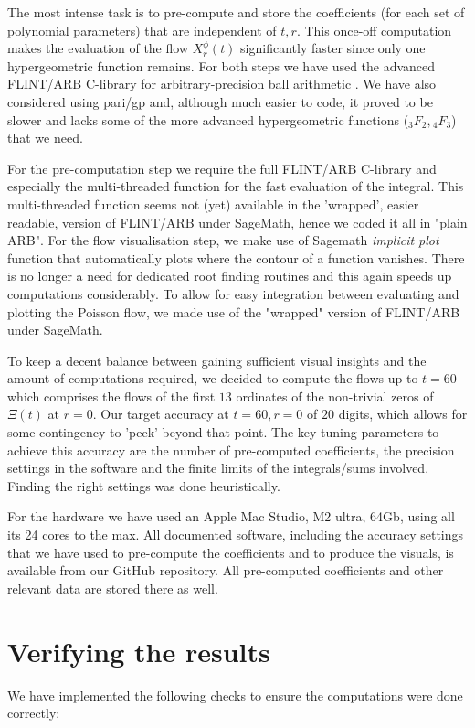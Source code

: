 \documentclass[a4paper,11pt,twoside]{amsart}
\begin{document}
The most intense task is to pre-compute and store the coefficients (for each set of polynomial parameters) that are independent of $t, r$. This once-off computation makes the evaluation of the flow $X^\phi_r(t)$ significantly faster since only one hypergeometric function remains. For both steps we have used the advanced FLINT/ARB C-library for arbitrary-precision ball arithmetic \cite{arb}. We have also considered using pari/gp and, although much easier to code, it proved to be slower and lacks some of the more advanced hypergeometric functions (${}_3F_2,{}_4F_3$) that we need.

For the pre-computation step we require the full FLINT/ARB C-library and especially the multi-threaded function for the fast evaluation of the integral. This multi-threaded function seems not (yet) available in the 'wrapped', easier readable, version of FLINT/ARB under SageMath, hence we coded it all in "plain ARB". For the flow visualisation step, we make use of Sagemath \textit{implicit plot} function that automatically plots where the contour of a function vanishes. There is no longer a need for dedicated root finding routines and this again speeds up computations considerably. To allow for easy integration between evaluating and plotting the Poisson flow, we made use of the "wrapped" version of FLINT/ARB under SageMath.    

To keep a decent balance between gaining sufficient visual insights and the amount of computations required, we decided to compute the flows up to $t=60$ which comprises the flows of the first $13$ ordinates of the non-trivial zeros of $\Xi(t)$ at $r=0$. Our target accuracy at $t=60, r=0$ of $20$ digits, which allows for some contingency to 'peek' beyond that point. The key tuning parameters to achieve this accuracy are the number of pre-computed coefficients, the precision settings in the software and the finite limits of the integrals/sums involved. Finding the right settings was done heuristically. 

For the hardware we have used an Apple Mac Studio, M2 ultra, 64Gb, using all its 24 cores to the max. All documented software, including the accuracy settings that we have used to pre-compute the coefficients and to produce the visuals, is available from our GitHub \cite{git} repository. All pre-computed coefficients and other relevant data are stored there as well.

\section{Verifying the results}\label{checks}
We have implemented the following checks to ensure the computations were done correctly:
\end{document}
